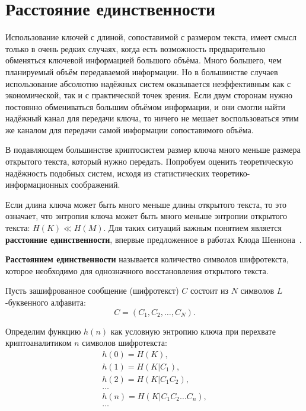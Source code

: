 \section{Расстояние единственности}\label{section_unicity_distance}

Использование ключей с длиной, сопоставимой с размером текста, имеет смысл только в очень редких случаях, когда есть возможность предварительно обменяться ключевой информацией большого объёма. Много большего, чем планируемый объём передаваемой информации. Но в большинстве случаев использование абсолютно надёжных систем оказывается неэффективным как с экономической, так и с практической точек зрения. Если двум сторонам нужно постоянно обмениваться большим объёмом информации, и они смогли найти надёжный канал для передачи ключа, то ничего не мешает воспользоваться этим же каналом для передачи самой информации сопоставимого объёма.

В подавляющем большинстве криптосистем размер ключа много меньше размера открытого текста, который нужно передать. Попробуем оценить теоретическую надёжность подобных систем, исходя из статистических теоретико-информационных соображений.

Если длина ключа может быть много меньше длины открытого текста, то это означает, что энтропия ключа может быть много меньше энтропии открытого текста: $H(K) \ll H(M)$. Для таких ситуаций важным понятием является \textbf{расстояние единственности}, впервые предложенное в работах Клода Шеннона~\cite{Golomb:2002, Schneier:2011}.

\begin{definition}\label{definition:unicity_distance}
\textbf{Расстоянием единственности} называется количество символов шифротекста, которое необходимо для однозначного восстановления открытого текста.
\end{definition}

Пусть зашифрованное сообщение (шифротекст) $C$ состоит из $N$ символов $L$-буквенного алфавита:
	\[C = (C_1, C_2, \dots, C_N).\]

Определим функцию $h(n)$ как условную энтропию ключа при перехвате криптоаналитиком $n$ символов шифротекста:
\[ \begin{array}{l}
    h ( 0 ) = H(K), \\
    h ( 1 ) = H(K | C_1), \\
    h ( 2 ) = H(K | C_1 C_2), \\
    \dots \\
    h ( n ) = H(K | C_1 C_2 \dots C_n), \\
    \dots
\end{array} \]

